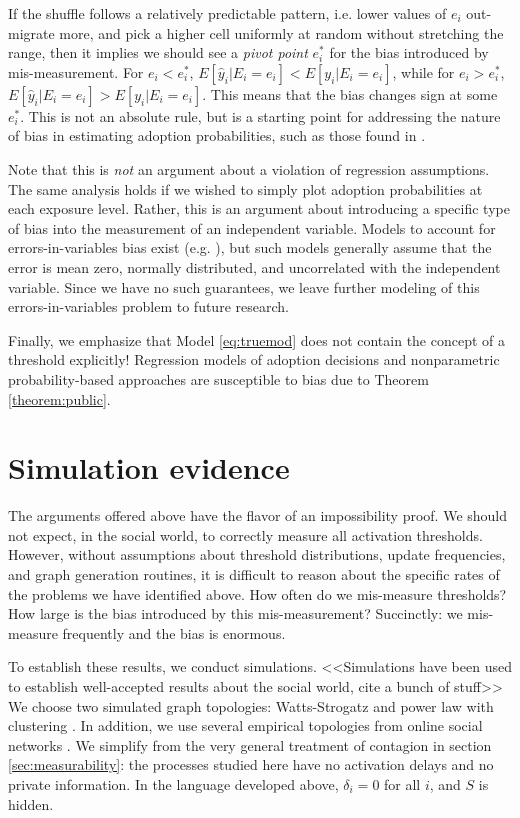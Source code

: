 \documentclass[a4paper]{article}
\begin{document}
If the shuffle follows a relatively predictable pattern, i.e. lower values of $e_i$ out-migrate more, and pick a higher cell uniformly at random without stretching the range, then it implies we should see a \emph{pivot point} $e_i^*$ for the bias introduced by mis-measurement. For $e_i < e_i^*$, $E[\hat{y}_i| E_i = e_i] < E[y_i| E_i = e_i]$, while for $e_i > e_i^*$, $E[\hat{y}_i| E_i = e_i] > E[y_i| E_i = e_i]$. This means that the bias changes sign at some $e_i^*$. This is not an absolute rule, but is a starting point for addressing the nature of bias in estimating adoption probabilities, such as those found in \parencite{Romero2011,Crandall2008}.

Note that this is \emph{not} an argument about a violation of regression assumptions. The same analysis holds if we wished to simply plot adoption probabilities at each exposure level. Rather, this is an argument about introducing a specific type of bias into the measurement of an independent variable. Models to account for errors-in-variables bias exist (e.g. \cite{frost2000}), but such models generally assume that the error is mean zero, normally distributed, and uncorrelated with the independent variable. Since we have no such guarantees, we leave further modeling of this errors-in-variables problem to future research.

Finally, we emphasize that Model \ref{eq:truemod} does not contain the concept of a threshold explicitly! Regression models of adoption decisions and nonparametric probability-based approaches are susceptible to bias due to Theorem \ref{theorem:public}.

\section{Simulation evidence}

The arguments offered above have the flavor of an impossibility proof. We should not expect, in the social world, to correctly measure all activation thresholds. However, without assumptions about threshold distributions, update frequencies, and graph generation routines, it is difficult to reason about the specific rates of the problems we have identified above. How often do we mis-measure thresholds? How large is the bias introduced by this mis-measurement? Succinctly: we mis-measure frequently and the bias is enormous.

To establish these results, we conduct simulations. <<Simulations have been used to establish well-accepted results about the social world, cite a bunch of stuff>> We choose two simulated graph topologies: Watts-Strogatz \parencite{} and power law with clustering \parencite{}. In addition, we use several empirical topologies from online social networks \parencite{}. We simplify from the very general treatment of contagion in section \ref{sec:measurability}: the processes studied here have no activation delays and no private information. In the language developed above, $\delta_i = 0$ for all $i$, and $S$ is hidden.
\end{document}
